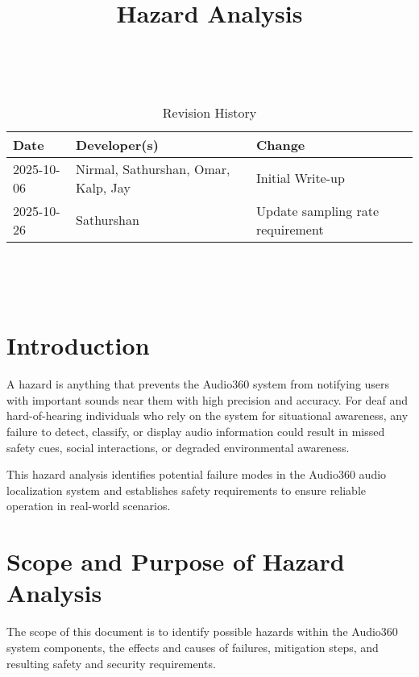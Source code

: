 \documentclass{article}
\title{Hazard Analysis\\\progname}
\author{\authname}
\date{}
\begin{document}
\maketitle
\thispagestyle{empty}

~\newpage


\begin{table}[hp]
\caption{Revision History} \label{TblRevisionHistory}
\begin{tabularx}{\textwidth}{llX}
\toprule
\textbf{Date} & \textbf{Developer(s)} & \textbf{Change}\\
\midrule
2025-10-06 &  Nirmal, Sathurshan, Omar, Kalp, Jay & Initial Write-up\\
2025-10-26 & Sathurshan & Update sampling rate requirement\\
\bottomrule
\end{tabularx}
\end{table}

~\newpage

\tableofcontents

~\newpage


\section{Introduction}

A hazard is anything that prevents the Audio360 system from notifying users with
important sounds near them with high precision and accuracy. For deaf and
hard-of-hearing individuals who rely on the system for situational awareness,
any failure to detect, classify, or display audio information could result in
missed safety cues, social interactions, or degraded environmental awareness.

This hazard analysis identifies potential failure modes in the Audio360 audio
localization system and establishes safety requirements to ensure reliable
operation in real-world scenarios.

\section{Scope and Purpose of Hazard Analysis}

The scope of this document is to identify possible hazards within the Audio360
system components, the effects and causes of failures, mitigation steps, and
resulting safety and security requirements.
\end{document}
